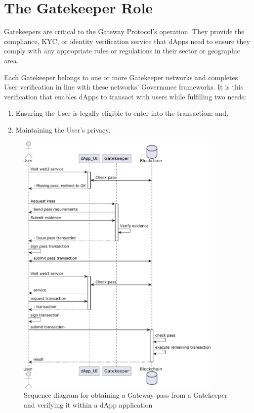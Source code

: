 \section{The Gatekeeper Role}\label{sec:gatekeeper}
Gatekeepers are critical to the Gateway Protocol’s operation. They provide the compliance, KYC, or identity verification service that dApps need to ensure they comply with any appropriate rules or regulations in their sector or geographic area.

Each Gatekeeper belongs to one or more Gatekeeper networks and completes User verification in line with these networks’ Governance frameworks. It is this verification that enables dApps to transact with users while fulfilling two needs:

\begin{enumerate}
\item Ensuring the User is legally eligible to enter into the transaction; and,
\item Maintaining the User’s privacy.
\end{enumerate}

\begin{figure}[h]
  \begin{center}
    \centering
    \includegraphics[width=100mm,scale=0.5]{figures/04-sequence-diagram.pdf}
    \caption{Sequence diagram for obtaining a Gateway pass from a Gatekeeper and verifying it within a dApp application}
  \end{center}
\end{figure}

